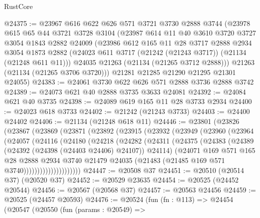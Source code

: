 \begin{lexlean}{RustCore}
\begin{coremodule}
@24375 := @23967
    @616
    @622
    @626
    @571
    @3721
    @3730
    @2888
    @3744
    (@23978
      @615
      @65
      @44
      @3721
      @3728
      @3104
      (@23987
        @614
        @11
        @40
        @3610
        @3720
        @3727
        @3054
        @1843
        @2882
        @24009
        (@23986
          @612
          @165
          @11
          @28
          @3717
          @2888
          @2934
          @3054
          @1873
          @2882
          (@24023 @611 @3717 (@21242 (@21243 @3717)) (@21134 (@21248 @611 @11)))
          @24035
          @21263
          (@21134 (@21265 @3712 @2888)))
        @21263
        (@21134 (@21265 @3706 @3720)))
      @21281
      @21285
      @21290
      @21295
      @21301
      @24055)
@24383 := @24061 @3730 @622 @626 @571 @2888 @3736 @2888 @3742
@24389 := @24073 @621 @40 @2888 @3735 @3633 @24081
@24392 := @24084 @621 @40 @3735
@24398 := @24089 @619 @165 @11 @28 @3733 @2934
@24400 := @24023 @618 @3733
@24402 := @21242 (@21243 @3733)
@24403 := @24400 @24402
@24406 := @21134 (@21248 @618 @11)
@24446 := @23801
    (@23826
      (@23867
        (@23869
          (@23871
            (@23892
              (@23915
                (@23932
                  (@23949
                    (@23960
                      (@23964
                        (@24057
                          (@24116
                            (@24180
                              (@24218
                                (@24282
                                  (@24311
                                    (@24375
                                      (@24383
                                        (@24389 (@24392 (@24398 (@24403 @24406) @24107)) @24114)
                                        (@24071
                                          @169
                                          @571
                                          @165
                                          @28
                                          @2888
                                          @2934
                                          @3740
                                          @21479
                                          @24035
                                          (@21483 (@21485 @169 @571 @3740)))))))))))))))))))))
@24447 := @20508 @37
@24451 := @20510 (@20514 @37) (@20520 @37)
@24452 := @20529 @23635
@24454 := @20525 (@24452 @20544)
@24456 := @20567 (@20568 @37)
@24457 := @20563 @24456
@24459 := @20525 (@24457 @20593)
@24476 := @20524
    (fun (fn : @113) =>
    @24454
      (@20547
        (@20550
          (fun (params : @20549) =>

\end{coremodule}
\end{lexlean}
